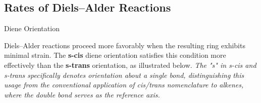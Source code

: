   \subsection{Rates of Diels--Alder Reactions}

    \begin{core}{Diene Orientation}

      Diels--Alder reactions proceed more favorably when the resulting ring exhibits minimal strain. The \textbf{s-cis} diene orientation satisfies this condition more effectively than the \textbf{s-trans} orientation, as illustrated below. \textit{The "s" in s-cis and s-trans specifically denotes orientation about a single bond, distinguishing this usage from the conventional application of cis/trans nomenclature to alkenes, where the double bond serves as the reference axis.}


\end{core}
